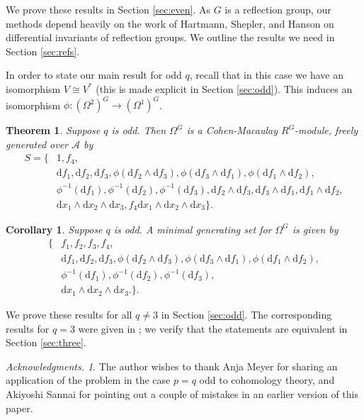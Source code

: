 \documentclass[a4paper]{amsart}
\newcommand{\dd}{\mathrm{d}}
\newtheorem{Theorem}[Lemma]{Theorem}
\newtheorem{Corollary}[Lemma]{Corollary}
\newtheorem*{Corollary of Conjecture}{Corollary of Conjecture}
\theoremstyle{definition}
\theoremstyle{remark}
\theoremstyle{Acknowledgments}
\newtheorem{ack}{Acknowledgments.}
\begin{document}
We prove these results in Section \ref{sec:even}. As $G$ is a reflection group, our methods depend heavily on the work of Hartmann, Shepler, and Hanson \cite{HartmannShepler, HansonShepler} on differential invariants of reflection groups. We outline the results we need in Section \ref{sec:refs}.

In order to state our main result for odd $q$, recall that in this case we have an isomorphism $V \cong V^*$ (this is made explicit in Section \ref{sec:odd}). This induces an isomorphism $\phi:(\Omega^2)^G \rightarrow (\Omega^1)^G$.

\begin{Theorem}\label{odd}
Suppose $q$ is odd. Then $\Omega^G$ is a Cohen-Macaulay $R^G$-module, freely generated over $\mathcal{A}$ by
\begin{align*} S =\{&1,f_4,\\ &\dd f_1, \dd f_2, \dd f_3, \phi(\dd f_2 \wedge \dd f_3), \phi(\dd f_3 \wedge \dd f_1), \phi(\dd f_1 \wedge \dd f_2),\\
&\phi^{-1}(\dd f_1), \phi^{-1}(\dd f_2), \phi^{-1}(\dd f_3), \dd f_2 \wedge \dd f_3, \dd f_3 \wedge \dd f_1, \dd f_1 \wedge \dd f_2,\\
& \dd x_1 \wedge \dd x_2 \wedge \dd x_3, f_4 \dd x_1 \wedge \dd x_2 \wedge \dd x_3 \}.\end{align*}
\end{Theorem}

\begin{Corollary}\label{oddmin}
Suppose $q$ is odd. A minimal generating set for $\Omega^G$ is given by
\begin{align*}\{&f_1,f_2,f_3,f_4,\\ &\dd f_1, \dd f_2, \dd f_3, \phi(\dd f_2 \wedge \dd f_3), \phi(\dd f_3 \wedge \dd f_1), \phi(\dd f_1 \wedge \dd f_2),\\
&\phi^{-1}(\dd f_1), \phi^{-1}(\dd f_2), \phi^{-1}(\dd f_3), \\
& \dd x_1 \wedge \dd x_2 \wedge \dd x_3.\}.\end{align*}
\end{Corollary}

We prove these results for all $q \neq 3$ in Section \ref{sec:odd}. The corresponding results for $q=3$ were given in \cite{ElmerMeyer}; we verify that the statements are equivalent in Section \ref{sec:three}.

\begin{ack} The author wishes to thank Anja Meyer for sharing an application of the problem in the case $p=q$ odd to cohomology theory, and Akiyoshi Sannai for pointing out a couple of mistakes in an earlier version of this paper.
\end{ack}
\end{document}

